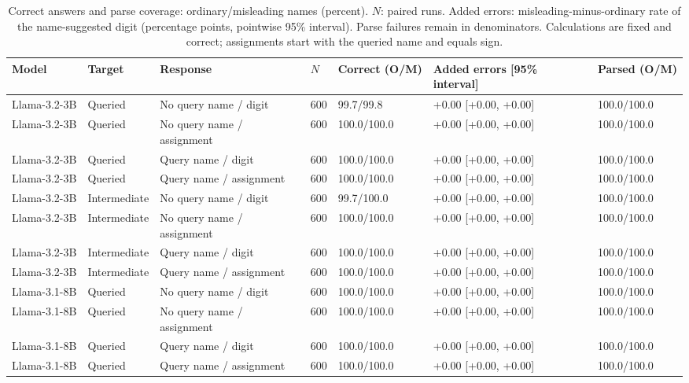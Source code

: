 \begin{table}[t]
\centering\small\setlength{\tabcolsep}{3pt}
\begin{tabular}{@{}p{}p{}p{}p{}p{}p{}p{}@{}}
\toprule
Model & Target & Response & $N$ & Correct (O/M) & Added errors [95\% interval] & Parsed (O/M) \\
\midrule
Llama-3.2-3B & Queried & No query name / digit & 600 & 99.7/99.8 & +0.00 [+0.00, +0.00] & 100.0/100.0 \\
Llama-3.2-3B & Queried & No query name / assignment & 600 & 100.0/100.0 & +0.00 [+0.00, +0.00] & 100.0/100.0 \\
Llama-3.2-3B & Queried & Query name / digit & 600 & 100.0/100.0 & +0.00 [+0.00, +0.00] & 100.0/100.0 \\
Llama-3.2-3B & Queried & Query name / assignment & 600 & 100.0/100.0 & +0.00 [+0.00, +0.00] & 100.0/100.0 \\
Llama-3.2-3B & Intermediate & No query name / digit & 600 & 99.7/100.0 & +0.00 [+0.00, +0.00] & 100.0/100.0 \\
Llama-3.2-3B & Intermediate & No query name / assignment & 600 & 100.0/100.0 & +0.00 [+0.00, +0.00] & 100.0/100.0 \\
Llama-3.2-3B & Intermediate & Query name / digit & 600 & 100.0/100.0 & +0.00 [+0.00, +0.00] & 100.0/100.0 \\
Llama-3.2-3B & Intermediate & Query name / assignment & 600 & 100.0/100.0 & +0.00 [+0.00, +0.00] & 100.0/100.0 \\
Llama-3.1-8B & Queried & No query name / digit & 600 & 100.0/100.0 & +0.00 [+0.00, +0.00] & 100.0/100.0 \\
Llama-3.1-8B & Queried & No query name / assignment & 600 & 100.0/100.0 & +0.00 [+0.00, +0.00] & 100.0/100.0 \\
Llama-3.1-8B & Queried & Query name / digit & 600 & 100.0/100.0 & +0.00 [+0.00, +0.00] & 100.0/100.0 \\
Llama-3.1-8B & Queried & Query name / assignment & 600 & 100.0/100.0 & +0.00 [+0.00, +0.00] & 100.0/100.0 \\
\bottomrule
\end{tabular}
\caption{Correct answers and parse coverage: ordinary/misleading names (percent). $N$: paired runs. Added errors: misleading-minus-ordinary rate of the name-suggested digit (percentage points, pointwise 95\% interval). Parse failures remain in denominators. Calculations are fixed and correct; assignments start with the queried name and equals sign.}
\label{tab:r7-final_query-cells-1}
\end{table}

